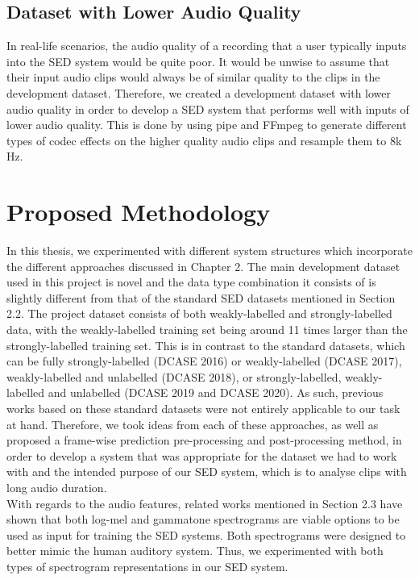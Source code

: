 \subsection{Dataset with Lower Audio Quality}
In real-life scenarios, the audio quality of a recording that a user typically inputs into the SED system would be quite poor. It would be unwise to assume that their input audio clips would always be of similar quality to the clips in the development dataset. Therefore, we created a development dataset with lower audio quality in order to develop a SED system that performs well with inputs of lower audio quality. This is done by using pipe and FFmpeg to generate different types of codec effects on the higher quality audio clips and resample them to 8k Hz. 

\section{Proposed Methodology}
In this thesis, we experimented with different system structures which incorporate the different approaches discussed in Chapter 2. The main development dataset used in this project is novel and the data type combination it consists of is slightly different from that of the standard SED datasets mentioned in Section 2.2. The project dataset consists of both weakly-labelled and strongly-labelled data, with the weakly-labelled training set being around 11 times larger than the strongly-labelled training set. This is in contrast to the standard datasets, which can be fully strongly-labelled (DCASE 2016) or weakly-labelled (DCASE 2017), weakly-labelled and unlabelled (DCASE 2018), or strongly-labelled, weakly-labelled and unlabelled (DCASE 2019 and DCASE 2020). As such, previous works based on these standard datasets were not entirely applicable to our task at hand. Therefore, we took ideas from each of these approaches, as well as proposed a frame-wise prediction pre-processing and post-processing method, in order to develop a system that was appropriate for the dataset we had to work with and the intended purpose of our SED system, which is to analyse clips with long audio duration.\\ 

With regards to the audio features, related works mentioned in Section 2.3 have shown that both log-mel and gammatone spectrograms are viable options to be used as input for training the SED systems. Both spectrograms were designed to better mimic the human auditory system. Thus, we experimented with both types of spectrogram representations in our SED system.\\

